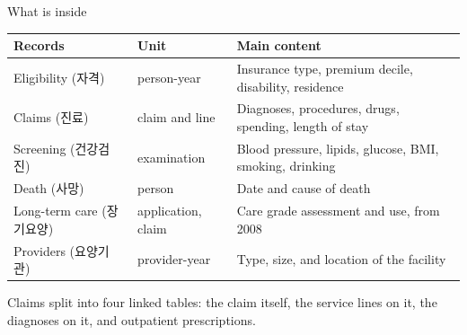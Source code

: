 \documentclass[aspectratio=169,11pt]{beamer}
\newcommand{\han}[1]{{\footnotesize\color{kdgray}(#1)}}
\begin{document}
\begin{frame}{What is inside}
  \vspace{2pt}
  \renewcommand{\arraystretch}{1.35}
  {\small
  \begin{tabularx}{\textwidth}{@{}l l >{\raggedright\arraybackslash}X@{}}
    \toprule
    \textbf{Records} & \textbf{Unit} & \textbf{Main content} \\
    \midrule
    Eligibility \han{자격} & person-year & Insurance type, premium decile, disability, residence \\
    Claims \han{진료} & claim and line & Diagnoses, procedures, drugs, spending, length of stay \\
    Screening \han{건강검진} & examination & Blood pressure, lipids, glucose, BMI, smoking, drinking \\
    Death \han{사망} & person & Date and cause of death \\
    Long-term care \han{장기요양} & application, claim & Care grade assessment and use, from 2008 \\
    Providers \han{요양기관} & provider-year & Type, size, and location of the facility \\
    \bottomrule
  \end{tabularx}}
  \vspace{7pt}

  {\small Claims split into four linked tables: the claim itself, the service
  lines on it, the diagnoses on it, and outpatient prescriptions.}
\end{frame}
\end{document}
